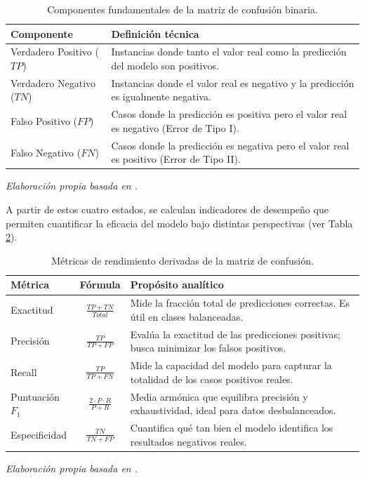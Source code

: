 \begin{table}[H]
    \centering
    \caption{Componentes fundamentales de la matriz de confusión binaria.}
    \label{tab:componentes_matriz}
    \begin{tabularx}{\textwidth}{l X}
        \toprule
        \textbf{Componente} & \textbf{Definición técnica} \\
        \midrule
        Verdadero Positivo ($TP$) & Instancias donde tanto el valor real como la predicción del modelo son positivos. \\
        Verdadero Negativo ($TN$) & Instancias donde el valor real es negativo y la predicción es igualmente negativa. \\
        Falso Positivo ($FP$) & Casos donde la predicción es positiva pero el valor real es negativo (Error de Tipo I). \\
        Falso Negativo ($FN$) & Casos donde la predicción es negativa pero el valor real es positivo (Error de Tipo II). \\
        \bottomrule
    \end{tabularx}
    \vspace{4pt}
    \small{\textit{Elaboración propia basada en \cite{Sathyanarayanan2024}.}}
\end{table}

A partir de estos cuatro estados, se calculan indicadores de desempeño que permiten cuantificar la eficacia del modelo bajo distintas perspectivas (ver Tabla \ref{tab:metricas_rendimiento}).

\begin{table}[H]
    \centering
    \caption{Métricas de rendimiento derivadas de la matriz de confusión.}
    \label{tab:metricas_rendimiento}
    \begin{tabularx}{\textwidth}{l c X}
        \toprule
        \textbf{Métrica} & \textbf{Fórmula} & \textbf{Propósito analítico} \\
        \midrule
        Exactitud & $\frac{TP + TN}{Total}$ & Mide la fracción total de predicciones correctas. Es útil en clases balanceadas. \\
        \addlinespace
        Precisión & $\frac{TP}{TP + FP}$ & Evalúa la exactitud de las predicciones positivas; busca minimizar los falsos positivos. \\
        \addlinespace
        Recall & $\frac{TP}{TP + FN}$ & Mide la capacidad del modelo para capturar la totalidad de los casos positivos reales. \\
        \addlinespace
        Puntuación $F_1$ & $\frac{2 \cdot P \cdot R}{P + R}$ & Media armónica que equilibra precisión y exhaustividad, ideal para datos desbalanceados. \\
        \addlinespace
        Especificidad & $\frac{TN}{TN + FP}$ & Cuantifica qué tan bien el modelo identifica los resultados negativos reales. \\
        \bottomrule
    \end{tabularx}
    \vspace{4pt}
    \small{\textit{Elaboración propia basada en \cite{Sathyanarayanan2024}.}}
\end{table}




